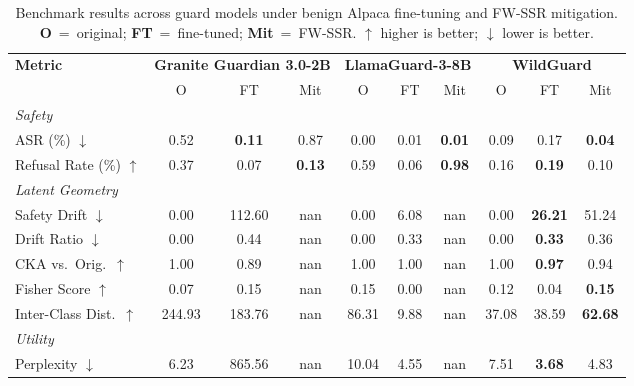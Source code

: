 \begin{table}[!ht]
\centering
\caption{Benchmark results across guard models under benign Alpaca fine-tuning and FW-SSR mitigation. \textbf{O}~=~original; \textbf{FT}~=~fine-tuned; \textbf{Mit}~=~FW-SSR. $\uparrow$ higher is better; $\downarrow$ lower is better.}
\label{tab:benchmark_main}
\small
\begin{tabular}{l ccc ccc ccc}
\toprule
\multirow{2}{*}{\textbf{Metric}}
  & \multicolumn{3}{c}{\textbf{Granite Guardian 3.0-2B}}
  & \multicolumn{3}{c}{\textbf{LlamaGuard-3-8B}}
  & \multicolumn{3}{c}{\textbf{WildGuard}} \\
\cmidrule(lr){2-4} \cmidrule(lr){5-7} \cmidrule(lr){8-10}
& O & FT & Mit & O & FT & Mit & O & FT & Mit \\
\midrule
\multicolumn{10}{l}{\textit{Safety}} \\[2pt]
ASR (\%) $\downarrow$ & 0.52 & \textbf{0.11} & 0.87 & 0.00 & 0.01 & \textbf{0.01} & 0.09 & 0.17 & \textbf{0.04} \\
Refusal Rate (\%) $\uparrow$ & 0.37 & 0.07 & \textbf{0.13} & 0.59 & 0.06 & \textbf{0.98} & 0.16 & \textbf{0.19} & 0.10 \\
\midrule
\multicolumn{10}{l}{\textit{Latent Geometry}} \\[2pt]
Safety Drift $\downarrow$ & 0.00 & 112.60 & nan & 0.00 & 6.08 & nan & 0.00 & \textbf{26.21} & 51.24 \\
Drift Ratio $\downarrow$ & 0.00 & 0.44 & nan & 0.00 & 0.33 & nan & 0.00 & \textbf{0.33} & 0.36 \\
CKA vs.\ Orig.\ $\uparrow$ & 1.00 & 0.89 & nan & 1.00 & 1.00 & nan & 1.00 & \textbf{0.97} & 0.94 \\
Fisher Score $\uparrow$ & 0.07 & 0.15 & nan & 0.15 & 0.00 & nan & 0.12 & 0.04 & \textbf{0.15} \\
Inter-Class Dist.\ $\uparrow$ & 244.93 & 183.76 & nan & 86.31 & 9.88 & nan & 37.08 & 38.59 & \textbf{62.68} \\
\midrule
\multicolumn{10}{l}{\textit{Utility}} \\[2pt]
Perplexity $\downarrow$ & 6.23 & 865.56 & nan & 10.04 & 4.55 & nan & 7.51 & \textbf{3.68} & 4.83 \\
\bottomrule
\end{tabular}
\end{table}
